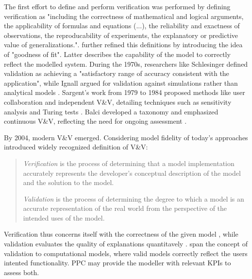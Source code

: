 The first effort to define and perform verification was performed by \autocite{machlup1955problem} defining verification as "including the correctness of mathematical and logical arguments, the applicability of formulas and equations (...), the reliability and exactness of observations, the reproducability of experiments, the explanatory or predictive value of generalizations.". \Autocite{naylor1967verification} further refined this definitions by introducing the idea of "goodness of fit". Latter describes the capability of the model to correctly reflect the modelled system. During the 1970s, researchers like Schlesinger \autocite{schlesinger1979terminology} defined validation as achieving a "satisfactory range of accuracy consistent with the application", while Ignall argued for validation against simulations rather than analytical models \autocite{ignall1978using}. Sargent's work from 1979 to 1984 proposed methods like user collaboration and independent V&V, detailing techniques such as sensitivity analysis and Turing tests \autocite{Sargent2010wsc}. Balci developed a taxonomy and emphasized continuous V&V, reflecting the need for ongoing assessment \autocite{balci2012life}.

By 2004, modern V&V emerged. Considering model fidelity of today's approaches \autocite{Oberkampf2004amr} introduced widely recognized definition of V&V:

\begin{quote}
  \textit{Verification} is the process of determining that a model implementation accurately represents the developer's conceptual description of the model and the solution to the model.

  \textit{Validation} is the process of determining the degree to which a model is an accurate representation of the real world from the perspective of the intended uses of the model. \autocite{Oberkampf2004amr}
\end{quote}

Verification thus concerns itself with the correctness of the given model \autocite{Sargent2010wsc}, while validation evaluates the quality of explanations quantitavely \autocite{Oberkampf2004amr}.  span the concept of validation to computational models, where valid models correctly reflect the users intented functionality. PPC may provide the modeller with relevant KPIs to assess both.


